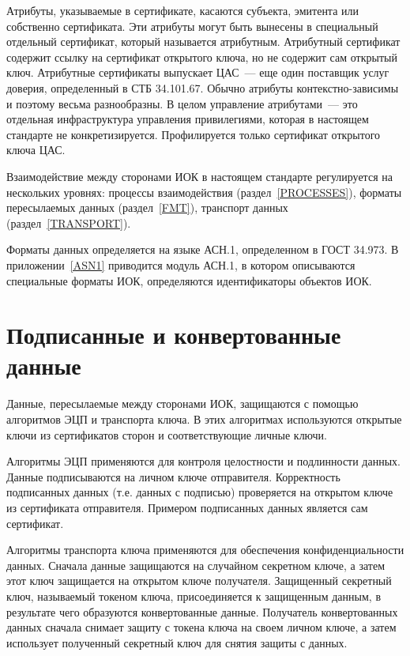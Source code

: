 Атрибуты, указываемые в сертификате, касаются субъекта, эмитента или 
собственно сертификата. Эти атрибуты могут быть вынесены в специальный 
отдельный сертификат, который называется атрибутным. Атрибутный  
сертификат содержит ссылку на сертификат открытого ключа, 
но не содержит сам открытый ключ. 
Атрибутные сертификаты выпускает ЦАС~--- еще один поставщик услуг доверия, 
определенный в СТБ 34.101.67. Обычно атрибуты контекстно-зависимы и поэтому 
весьма разнообразны. В целом управление атрибутами~---  
это отдельная  инфраструктура управления привилегиями, которая в настоящем 
стандарте не конкретизируется. Профилируется только сертификат открытого 
ключа ЦАС.

Взаимодействие между сторонами ИОК в настоящем стандарте регулируется на 
нескольких уровнях: процессы взаимодействия (раздел~\ref{PROCESSES}), 
форматы пересылаемых данных (раздел~\ref{FMT}), 
транспорт данных (раздел~\ref{TRANSPORT}).

Форматы данных определяется на языке АСН.1, определенном в ГОСТ 34.973.
В приложении~\ref{ASN1} приводится модуль АСН.1, в котором описываются
специальные форматы ИОК, определяются идентификаторы объектов ИОК.

\section{Подписанные и конвертованные данные}

Данные, пересылаемые между сторонами ИОК, защищаются с помощью 
алгоритмов ЭЦП и транспорта ключа. В этих алгоритмах используются
открытые ключи из сертификатов сторон и соответствующие личные ключи.

Алгоритмы ЭЦП применяются для контроля целостности и подлинности данных.
Данные подписываются на личном ключе отправителя. Корректность подписанных 
данных (т.е. данных с подписью) проверяется на открытом ключе из 
сертификата отправителя. Примером подписанных данных является сам сертификат. 

Алгоритмы транспорта ключа применяются для обеспечения конфиденциальности 
данных. Сначала данные защищаются на случайном секретном ключе, а затем 
этот ключ защищается на открытом ключе получателя. 
Защищенный секретный ключ, называемый токеном ключа, присоединяется к защищенным данным,
в результате чего образуются конвертованные данные. 
Получатель конвертованных данных сначала снимает защиту с токена ключа на своем 
личном ключе, а затем использует полученный секретный ключ для снятия 
защиты с данных.  

